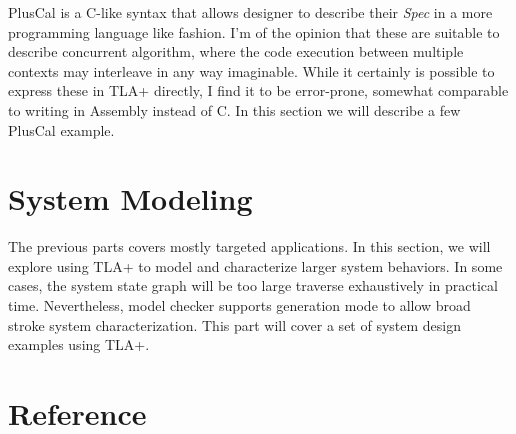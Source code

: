 \documentclass{kdp}
\begin{document}
PlusCal is a C-like syntax that allows designer to describe their \textit{Spec}
in a more programming language like fashion. I'm of the opinion that these are
suitable to describe concurrent algorithm, where the code execution between
multiple contexts may interleave in any way imaginable. While it certainly is
possible to express these in TLA+ directly, I find it to be error-prone,
somewhat comparable to writing in Assembly instead of C. In this section we will
describe a few PlusCal example.





\part{System Modeling}

The previous parts covers mostly targeted applications. In this section, we will
explore using TLA+ to model and characterize larger system behaviors. In some
cases, the system state graph will be too large traverse exhaustively in
practical time. Nevertheless, model checker supports generation mode to allow
broad stroke system characterization. This part will cover a set of system
design examples using TLA+. 



\part{Reference}










\end{document}
